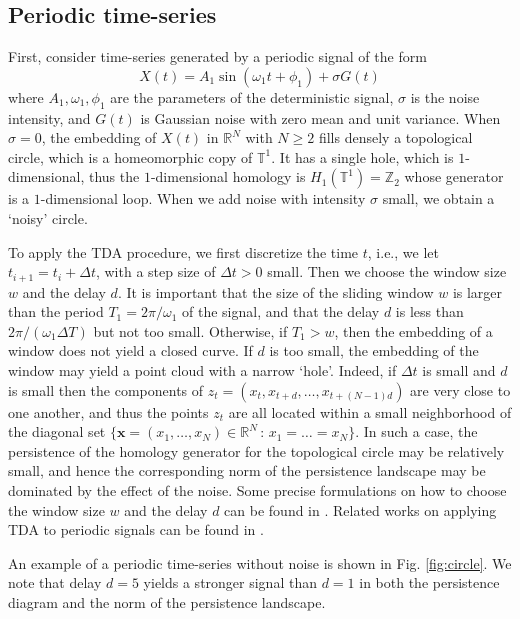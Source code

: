 \documentclass[11pt]{amsart}
\theoremstyle{definition}
\theoremstyle{remark}
\numberwithin{equation}{section}
\def\R{\mathbb{R}}
\begin{document}
\subsection{Periodic time-series}
First, consider time-series generated by a periodic signal of the form
\[X(t)=A_1\sin(\omega_1 t+\phi_1)+\sigma G(t) \]
where $A_1, \omega_1,\phi_1$ are the parameters of the deterministic signal, $\sigma$ is the noise intensity, and $G(t)$ is Gaussian noise with zero mean
and unit variance.
When $\sigma=0$, the embedding of $X(t)$ in $\R^N$ with $N\geq 2$   fills densely a topological circle, which is a homeomorphic copy of $\mathbb{T}^1$.
It has a single hole, which is $1$-dimensional, thus the $1$-dimensional homology is $H_1(\mathbb{T}^1)=\mathbb{Z}_2$ whose generator is a $1$-dimensional loop. When we add noise with intensity $\sigma$ small, we obtain a `noisy' circle.



To apply the TDA procedure, we first discretize the  time $t$, i.e., we let $t_{i+1}=t_i+\Delta t$, with a step size of $\Delta t>0$ small.
Then  we choose the window size $w$ and the delay $d$.
It is important that the size of the sliding window $w$ is larger than the period $T_1=2\pi/\omega_1$ of the signal, and that the delay $d$ is less than $2\pi/ (\omega_1\Delta T )$ but not too small. Otherwise,  if $T_1>w$, then the  embedding of a window does not yield a closed curve.
If $d$ is too small, the embedding of the window may yield a point cloud with a narrow `hole'.
Indeed,  if $\Delta t$ is small and $d$ is small then the components of  $z_{t}= (x_{t},x_{t+d},\ldots,x_{t+(N-1)d})$ are very close to one another, and
thus the points $z_t$ are all located within a small neighborhood of the diagonal set $\{\textbf{x}=(x_1,\ldots, x_N)\in\R^N\,:\,x_1=\ldots=x_N\}$.
In such a case, the persistence of the homology generator for the topological circle may be relatively small, and hence the corresponding norm of the persistence
landscape  may be dominated by the effect of the noise. Some precise formulations on how to choose the window size $w$ and the delay $d$ can be found in \cite{perea2015sliding}. Related works on applying TDA to periodic signals can be found in \cite{khasawneh2018topological,dlotko2019cyclicality}.


An example of a periodic time-series without noise is shown in Fig. \ref{fig:circle}. %
We note that delay $d=5$ yields a  stronger signal than $d=1$ in both the persistence diagram  and the norm  of the persistence landscape.
\end{document}

